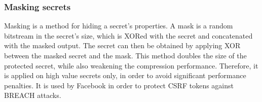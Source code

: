 \subsubsection{Masking secrets}\label{subsec:masking}
Masking is a method for hiding a secret's properties. A mask is a random
bitstream in the secret's size, which is XORed with the secret and concatenated
with the masked output. The secret can then be obtained by applying XOR between
the masked secret and the mask. This method doubles the size of the protected
secret, while also weakening the compression performance. Therefore, it is
applied on high value secrets only, in order to avoid significant performance
penalties. It is used by Facebook \cite{facebookbreach} in order to protect CSRF
tokens against BREACH attacks.
